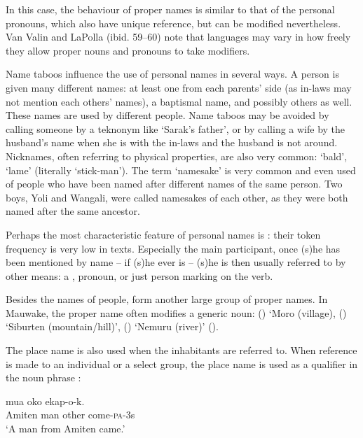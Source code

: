 In this case, the behaviour of proper names is similar to that of the personal pronouns, which also have unique reference, but can be modified nevertheless. {Van Valin and LaPolla} (ibid. 59--60) note that languages may vary in how freely they allow proper nouns and pronouns to take modifiers.

Name taboos influence the use of personal names in several ways. A person is given many different names: at least one from each parents' side (as in-laws may not mention each others' names), a baptismal name, and possibly others as well. These names are used by different people. Name taboos may be avoided by calling someone by a teknonym like `Sarak's father', or by calling a wife by the husband's name when she is with the in-laws and the husband is not around. Nicknames, often referring to physical properties, are also very common:  `bald',  `lame' (literally `stick-man'). The term `namesake' is very common and even used of people who have been named after different names of the same person. Two boys, Yoli and Wangali, were called namesakes of each other, as they were both named after the same ancestor. 

Perhaps the most characteristic feature of personal names is : their token frequency is very low in texts. Especially the main participant, once (s)he has been mentioned by name -- if (s)he ever is -- (s)he is then usually referred to by other means: a , pronoun, or just person marking on the verb. 

Besides the names of people,  form another large group of proper names. In Mauwake, the proper name often modifies a generic noun:  () `Moro (village),  () `Siburten (mountain/hill)',  () `Nemuru (river)' (). 

The place name is also used when the inhabitants are referred to. When reference is made to an individual or a select group, the place name is used as a qualifier in the noun phrase : 

\ea%
\label{ex:3:x421}
\gll {}  mua oko ekap-o-k. \\
Amiten man other come-\textsc{pa}-3s\\
\glt`A man from Amiten came.'
\z

